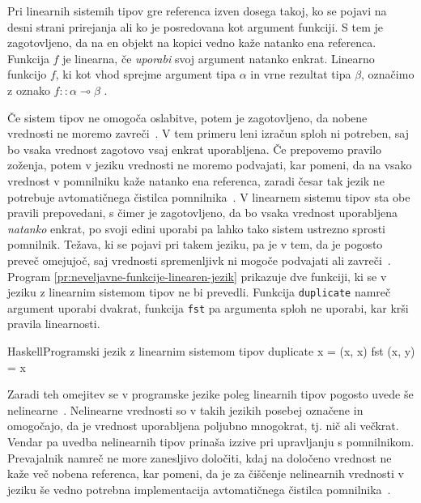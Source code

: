 Pri linearnih sistemih tipov gre referenca izven dosega takoj, ko se pojavi na desni strani prirejanja ali ko je posredovana kot argument funkciji. S tem je zagotovljeno, da na en objekt na kopici vedno kaže natanko ena referenca. Funkcija $f$ je linearna, če \textit{uporabi} svoj argument natanko enkrat. Linearno funkcijo $f$, ki kot vhod sprejme argument tipa $\alpha$ in vrne rezultat tipa $\beta$, označimo z oznako $f :: \alpha \multimap \beta$ .

Če sistem tipov ne omogoča oslabitve, potem je zagotovljeno, da nobene vrednosti ne moremo zavreči~\cite{wadler1991there}. V tem primeru leni izračun sploh ni potreben, saj bo vsaka vrednost zagotovo vsaj enkrat uporabljena. Če prepovemo pravilo zoženja, potem v jeziku vrednosti ne moremo podvajati, kar pomeni, da na vsako vrednost v pomnilniku kaže natanko ena referenca, zaradi česar tak jezik ne potrebuje avtomatičnega čistilca pomnilnika~\cite{wadler1991there, wadler1990linear, marshall2022linearity}. V linearnem sistemu tipov sta obe pravili prepovedani, s čimer je zagotovljeno, da bo vsaka vrednost uporabljena \textit{natanko} enkrat, po svoji edini uporabi pa lahko tako sistem ustrezno sprosti pomnilnik. Težava, ki se pojavi pri takem jeziku, pa je v tem, da je pogosto preveč omejujoč, saj vrednosti spremenljivk ni mogoče podvajati ali zavreči~\cite{wadler1990linear}. Program \ref{pr:neveljavne-funkcije-linearen-jezik} prikazuje dve funkciji, ki se v jeziku z linearnim sistemom tipov ne bi prevedli. Funkcija \texttt{duplicate} namreč argument  uporabi dvakrat, funkcija \texttt{fst} pa argumenta  sploh ne uporabi, kar krši pravila linearnosti.

\begin{primer}[ht]
\centering
\begin{code-box}{Haskell}{Programski jezik z linearnim sistemom tipov \xmark}
duplicate x = (x, x)
fst (x, y) = x
\end{code-box}
\caption{Neveljavni funkciji pri programskem jeziku z linearnim sistemom tipov}
\label{pr:neveljavne-funkcije-linearen-jezik}
\end{primer}

Zaradi teh omejitev se v programske jezike poleg linearnih tipov pogosto uvede še nelinearne~\cite{pierce2004advanced, wadler1990linear, marshall2022linearity}. Nelinearne vrednosti so v takih jezikih posebej označene in omogočajo, da je vrednost uporabljena poljubno mnogokrat, tj. nič ali večkrat. Vendar pa uvedba nelinearnih tipov prinaša izzive pri upravljanju s pomnilnikom. Prevajalnik namreč ne more zanesljivo določiti, kdaj na določeno vrednost ne kaže več nobena referenca, kar pomeni, da je za čiščenje nelinearnih vrednosti v jeziku še vedno potrebna implementacija avtomatičnega čistilca pomnilnika~\cite{wadler1990linear}.

